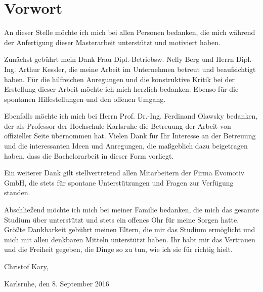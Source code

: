 \chapter*{Vorwort}
\thispagestyle{empty}

An dieser Stelle möchte ich mich bei allen Personen bedanken, die mich während der Anfertigung dieser Masterarbeit unterstützt und motiviert haben.

Zunächst gebührt mein Dank Frau Dipl.-Betriebsw. Nelly Berg und Herrn Dipl.-Ing. Arthur Kessler, die meine Arbeit im Unternehmen betreut und beaufsichtigt haben. Für die hilfreichen Anregungen und die konstruktive Kritik bei der Erstellung dieser Arbeit möchte ich mich herzlich bedanken. Ebenso für die spontanen Hilfestellungen und den offenen Umgang. 

Ebenfalls möchte ich mich bei Herrn Prof. Dr.-Ing. Ferdinand Olawsky bedanken, der als Professor der Hochschule Karlsruhe die Betreuung der Arbeit von offizieller Seite übernommen hat. Vielen Dank für Ihr Interesse an der Betreuung und die interessanten Ideen und Anregungen, die maßgeblich dazu beigetragen haben, dass die Bachelorarbeit in dieser Form vorliegt.

Ein weiterer Dank gilt stellvertretend allen Mitarbeitern der Firma Evomotiv GmbH, die stets für spontane Unterstützungen und Fragen zur Verfügung standen.

Abschließend möchte ich mich bei meiner Familie bedanken, die mich das gesamte Studium über unterstützt und stets ein offenes Ohr für meine Sorgen hatte. Größte Dankbarkeit gebührt meinen Eltern, die mir das Studium ermöglicht und mich mit allen denkbaren Mitteln unterstützt haben. Ihr habt mir das Vertrauen und die Freiheit gegeben, die Dinge so zu tun, wie ich sie für richtig hielt.

\vspace{10mm}
Christof Kary,

Karlsruhe, den 8. September 2016
